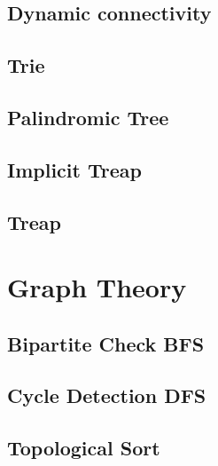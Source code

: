\documentclass[10pt]{article}
\begin{document}
\begin{multicols*}{2}
\subsection{Dynamic connectivity}


\subsection{Trie}


\subsection{Palindromic Tree}


\subsection{Implicit Treap}


\subsection{Treap}



\section{Graph Theory}

\subsection{Bipartite Check BFS}


\subsection{Cycle Detection DFS}


\subsection{Topological Sort}



\end{multicols*}
\end{document}
